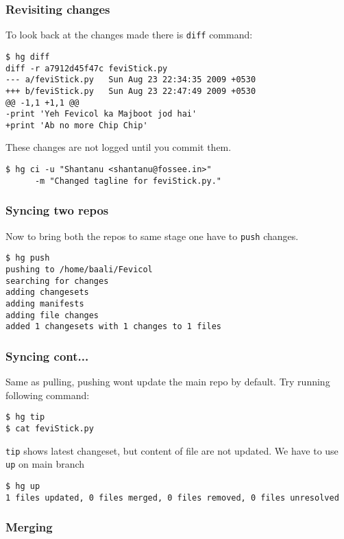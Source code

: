 \documentclass[14pt,compress]{beamer}
\newcommand{\typ}[1]{\lstinline{#1}}
\begin{document}
\begin{frame}[fragile]
  \frametitle{Revisiting changes}
To look back at the changes made there is \typ{diff} command:
\begin{lstlisting}
$ hg diff
diff -r a7912d45f47c feviStick.py
--- a/feviStick.py   Sun Aug 23 22:34:35 2009 +0530
+++ b/feviStick.py   Sun Aug 23 22:47:49 2009 +0530
@@ -1,1 +1,1 @@
-print 'Yeh Fevicol ka Majboot jod hai'
+print 'Ab no more Chip Chip'
  \end{lstlisting} %
  These changes are not logged until you commit them.\\
  \begin{lstlisting}
$ hg ci -u "Shantanu <shantanu@fossee.in>" 
      -m "Changed tagline for feviStick.py."
  \end{lstlisting} %
\end{frame}

\begin{frame}[fragile]
  \frametitle{Syncing two repos}
  Now to bring both the repos to same stage one have to \typ{push} changes.
  \begin{lstlisting}
$ hg push 
pushing to /home/baali/Fevicol
searching for changes
adding changesets
adding manifests
adding file changes
added 1 changesets with 1 changes to 1 files
  \end{lstlisting} %
\end{frame}


\begin{frame}[fragile]
  \frametitle{Syncing cont...}
  Same as pulling, pushing wont update the main repo by default. Try running following command:
  \begin{lstlisting}
$ hg tip    
$ cat feviStick.py
  \end{lstlisting}
  \typ{tip} shows latest changeset, but content of file are not updated. We have to use \typ{up} on main branch
  \begin{lstlisting}
$ hg up
1 files updated, 0 files merged, 0 files removed, 0 files unresolved    
  \end{lstlisting} %
\end{frame}

\begin{frame}[fragile]
  \frametitle{Merging}

\end{frame}

\begin{frame}[fragile]
  \frametitle{}

\end{frame}
\end{document}
